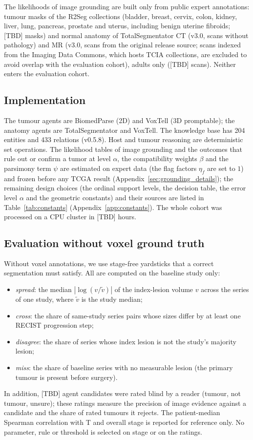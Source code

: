 \documentclass[fleqn,10pt]{olplainarticle}
\begin{document}
The likelihoods of image grounding are built only from public expert annotations: tumour masks of the R2Seg collections
(bladder, breast, cervix, colon, kidney, liver, lung, pancreas, prostate and uterus, including benign uterine fibroids;
[TBD] masks) and normal anatomy of
TotalSegmentator CT (v3.0, scans without pathology) and MR (v3.0, scans from the original release source; scans indexed from the
Imaging Data Commons, which hosts TCIA collections, are excluded to avoid overlap with the evaluation cohort), adults only ([TBD] scans). Neither enters the evaluation cohort.

\subsection{Implementation}
The tumour agents are BiomedParse (2D) and VoxTell (3D promptable); the anatomy agents are TotalSegmentator and VoxTell. The
knowledge base has 204 entities and 433 relations (v0.5.8). Host and tumour reasoning are deterministic set operations.
The likelihood tables of image grounding and the outcomes that rule out or confirm a tumor at level $\alpha$, the
compatibility weights $\beta$ and the parsimony term $\psi$ are estimated on expert data (the flag factors $\eta_f$ are set to
$1$) and frozen
before any TCGA result (Appendix~\ref{sec:grounding_details}); the remaining design choices (the ordinal support levels, the
decision table, the error level $\alpha$ and the geometric constants) and their sources are listed in Table~\ref{tab:constants} (Appendix~\ref{app:constants}). The whole cohort was processed on a CPU cluster in [TBD] hours.

\subsection{Evaluation without voxel ground truth}
\label{sec:eval_protocol}
Without voxel annotations, we use stage-free yardsticks that a correct segmentation must satisfy. All are computed on
the baseline study only:
\begin{itemize}
  \item \emph{spread}: the median $|\log(v/\tilde v)|$ of the index-lesion volume $v$ across the series of one study,
  where $\tilde v$ is the study median;
  \item \emph{cross}: the share of same-study series pairs whose sizes differ by at least one RECIST progression step;
  \item \emph{disagree}: the share of series whose index lesion is not the study's majority lesion;
  \item \emph{miss}: the share of baseline series with no measurable lesion (the primary tumour is present before
  surgery).
\end{itemize}
In addition, [TBD] agent candidates were rated blind by a reader (tumour, not tumour, unsure); these ratings measure the
precision of image evidence against a candidate and the share of rated tumours it rejects. The patient-median Spearman
correlation with T and overall stage is reported for reference only. No parameter, rule or threshold is selected on stage
or on the ratings.
\end{document}

